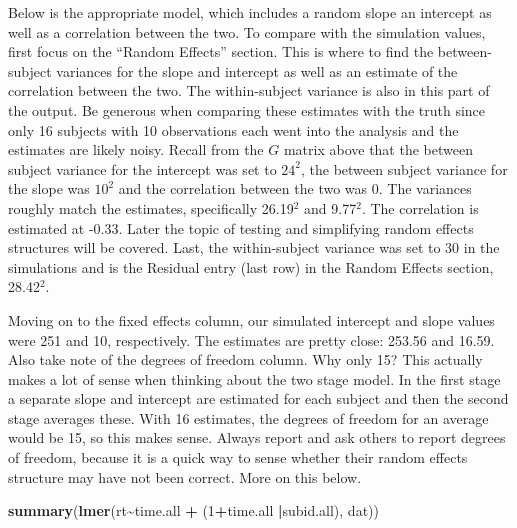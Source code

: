 \documentclass[
]{book}
\newenvironment{Shaded}{\begin{snugshade}}{\end{snugshade}}
\newcommand{\DecValTok}[1]{\textcolor[rgb]{0.00,0.00,0.81}{#1}}
\newcommand{\KeywordTok}[1]{\textcolor[rgb]{0.13,0.29,0.53}{\textbf{#1}}}
\newcommand{\NormalTok}[1]{#1}
\newcommand{\OperatorTok}[1]{\textcolor[rgb]{0.81,0.36,0.00}{\textbf{#1}}}
\newcommand{\StringTok}[1]{\textcolor[rgb]{0.31,0.60,0.02}{#1}}
\begin{document}
Below is the appropriate model, which includes a random slope an intercept as well as a correlation between the two. To compare with the simulation values, first focus on the ``Random Effects'' section. This is where to find the between-subject variances for the slope and intercept as well as an estimate of the correlation between the two. The within-subject variance is also in this part of the output. Be generous when comparing these estimates with the truth since only 16 subjects with 10 observations each went into the analysis and the estimates are likely noisy. Recall from the \(G\) matrix above that the between subject variance for the intercept was set to \(24^2\), the between subject variance for the slope was \(10^2\) and the correlation between the two was 0. The variances roughly match the estimates, specifically 26.19\(^2\) and 9.77\(^2\). The correlation is estimated at -0.33. Later the topic of testing and simplifying random effects structures will be covered. Last, the within-subject variance was set to 30 in the simulations and is the Residual entry (last row) in the Random Effects section, 28.42\(^2\).

Moving on to the fixed effects column, our simulated intercept and slope values were 251 and 10, respectively. The estimates are pretty close: 253.56 and 16.59. Also take note of the degrees of freedom column. Why only 15? This actually makes a lot of sense when thinking about the two stage model. In the first stage a separate slope and intercept are estimated for each subject and then the second stage averages these. With 16 estimates, the degrees of freedom for an average would be 15, so this makes sense. Always report and ask others to report degrees of freedom, because it is a quick way to sense whether their random effects structure may have not been correct. More on this below.

\begin{Shaded}
\begin{Highlighting}[]
\KeywordTok{summary}\NormalTok{(}\KeywordTok{lmer}\NormalTok{(rt}\OperatorTok{\textasciitilde{}}\NormalTok{time.all }\OperatorTok{+}\StringTok{ }\NormalTok{(}\DecValTok{1}\OperatorTok{+}\NormalTok{time.all }\OperatorTok{|}\NormalTok{subid.all), dat))}
\end{Highlighting}
\end{Shaded}
\end{document}
